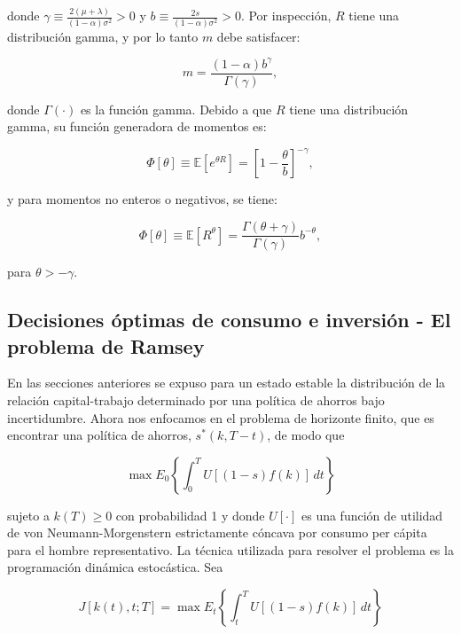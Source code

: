 \documentclass[a4paper,12pt]{article}
\begin{document}
donde $\gamma \equiv \frac{2(\mu + \lambda)}{(1 - \alpha)\sigma^2} > 0$ y $b \equiv \frac{2s}{(1 - \alpha)\sigma^2} > 0$. Por inspección, $R$ tiene una distribución gamma, y por lo tanto $m$ debe satisfacer:

\begin{equation}
	m = \frac{(1 - \alpha)b^\gamma}{\Gamma(\gamma)},
\end{equation}

donde $\Gamma(\cdot)$ es la función gamma. Debido a que $R$ tiene una distribución gamma, su función generadora de momentos es:

\begin{equation}
	\Phi[\theta] \equiv \mathbb{E}\left[e^{\theta R}\right] = \left[1 - \frac{\theta}{b}\right]^{-\gamma},
\end{equation}

y para momentos no enteros o negativos, se tiene:

\begin{equation}
	\Phi[\theta] \equiv \mathbb{E}[R^\theta] = \frac{\Gamma(\theta + \gamma)}{\Gamma(\gamma)} b^{-\theta},
\end{equation}

para $\theta > -\gamma$.

	
	\subsection{Decisiones óptimas de consumo e inversión - El problema de Ramsey}

En las secciones anteriores se expuso para un estado estable la distribución de la relación capital-trabajo determinado por una política de ahorros bajo incertidumbre. Ahora nos enfocamos en el problema de horizonte finito, que es encontrar una política de ahorros, \( s^*(k, T - t) \), de modo que

		\begin{equation}
\max E_0 \left\{ \int_0^T U[(1 - s)f(k)] \, dt \right\}
		\end{equation}

sujeto a \( k(T) \geq 0 \) con probabilidad 1 y donde \( U[\cdot] \) es una función de utilidad de von Neumann-Morgenstern estrictamente cóncava por consumo per cápita para el hombre representativo. La técnica utilizada para resolver el problema es la programación dinámica estocástica. Sea

		\begin{equation}
J[k(t), t; T] = \max E_t \left\{ \int_t^T U[(1 - s)f(k)] \, dt \right\}
		\end{equation}
\end{document}
